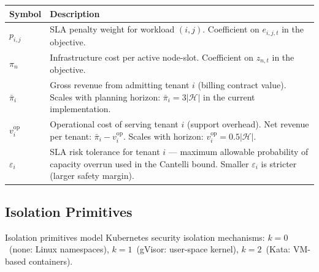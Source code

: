 \documentclass[11pt,a4paper]{article}
\newcommand{\cH}{\mathcal{H}}           %
\newcommand{\eps}{\varepsilon}          %
\begin{document}
\begin{longtable}{@{}p{2.2cm}p{11.5cm}@{}}
  \toprule
  \textbf{Symbol} & \textbf{Description} \\
  \midrule
  \endhead
  $p_{i,j}$           & SLA penalty weight for workload $(i,j)$.  Coefficient on
                         $e_{i,j,t}$ in the objective. \\[4pt]
  $\pi_n$             & Infrastructure cost per active node-slot.  Coefficient on
                         $z_{n,t}$ in the objective. \\[4pt]
  $\bar{\pi}_i$       & Gross revenue from admitting tenant $i$ (billing contract value).
                         Scales with planning horizon: $\bar{\pi}_i = 3|\cH|$
                         in the current implementation. \\[4pt]
  $v_i^{\text{op}}$   & Operational cost of serving tenant $i$ (support overhead).
                         Net revenue per tenant: $\bar{\pi}_i - v_i^{\text{op}}$.
                         Scales with horizon: $v_i^{\text{op}} = 0.5|\cH|$. \\[4pt]
  $\eps_i$            & SLA risk tolerance for tenant $i$ --- maximum allowable
                         probability of capacity overrun used in the Cantelli bound.
                         Smaller $\eps_i$ is stricter (larger safety margin). \\
  \bottomrule
\end{longtable}

\subsection{Isolation Primitives}

Isolation primitives model Kubernetes security isolation mechanisms:
$k=0$~(none: Linux namespaces), $k=1$~(gVisor: user-space kernel),
$k=2$~(Kata: VM-based containers).
\end{document}
